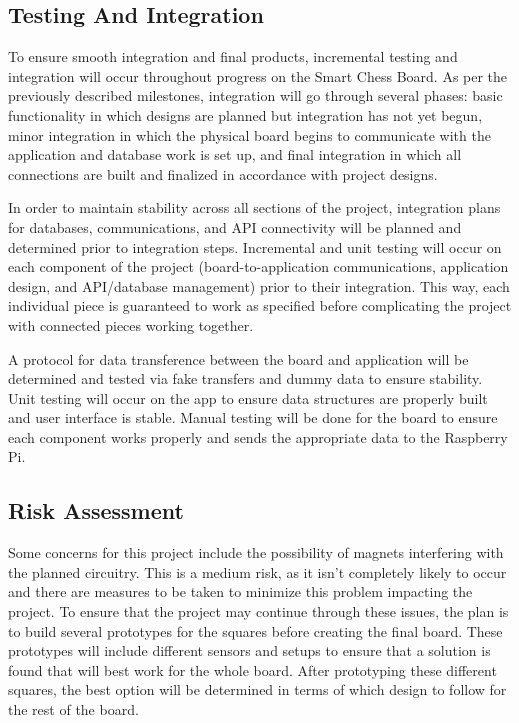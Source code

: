 \documentclass[11pt,journal]{IEEEtran}
\begin{document}
\subsection{Testing And Integration}
To ensure smooth integration and final products, incremental testing and integration will occur throughout progress on the Smart Chess Board. As per the previously described milestones, integration will go through several phases: basic functionality in which designs are planned but integration has not yet begun, minor integration in which the physical board begins to communicate with the application and database work is set up, and final integration in which all connections are built and finalized in accordance with project designs.

In order to maintain stability across all sections of the project, integration plans for databases, communications, and API connectivity will be planned and determined prior to integration steps. Incremental and unit testing will occur on each component of the project (board-to-application communications, application design, and API/database management) prior to their integration. This way, each individual piece is guaranteed to work as specified before complicating the project with connected pieces working together.

A protocol for data transference between the board and application will be determined and tested via fake transfers and dummy data to ensure stability. Unit testing will occur on the app to ensure data structures are properly built and user interface is stable. Manual testing will be done for the board to ensure each component works properly and sends the appropriate data to the Raspberry Pi.

\subsection{Risk Assessment}
Some concerns for this project include the possibility of magnets interfering with the planned circuitry. This is a medium risk, as it isn't completely likely to occur and there are measures to be taken to minimize this problem impacting the project. To ensure that the project may continue through these issues, the plan is to build several prototypes for the squares before creating the final board. These prototypes will include different sensors and setups to ensure that a solution is found that will best work for the whole board. After prototyping these different squares, the best option will be determined in terms of which design to follow for the rest of the board.
\end{document}

